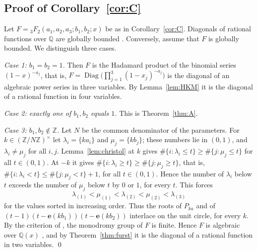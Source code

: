 \documentclass[11pt]{amsart}
\theoremstyle{definition}
\theoremstyle{remark}
\numberwithin{equation}{section}
\newcommand{\Q}{\mathbb{Q}}
\newcommand{\Z}{\mathbb{Z}}
\newcommand{\e}{\mathbf{e}}
\DeclareMathOperator{\Diag}{Diag}
\begin{document}
\subsection{Proof of Corollary~\ref{cor:C}}\label{subsec:proofC}
Let $F={}_3F_2(a_1,a_2,a_3;b_1,b_2;x)$ be as in Corollary~\ref{cor:C}. Diagonals of rational functions over $\Q$ are globally bounded \citep{Christol1990}. Conversely, assume that $F$ is globally bounded. We distinguish three cases.

\emph{Case 1: $b_1=b_2=1$.} Then $F$ is the Hadamard product of the binomial series $(1-x)^{-a_j}$, that is, $F=\Diag\big(\prod_{j=1}^3(1-x_j)^{-a_j}\big)$ is the diagonal of an algebraic power series in three variables. By Lemma~\ref{lem:HKM} it is the diagonal of a rational function in four variables.

\emph{Case 2: exactly one of $b_1,b_2$ equals $1$.} This is Theorem~\ref{thm:A}.

\emph{Case 3: $b_1,b_2\notin\Z$.} Let $N$ be the common denominator of the parameters. For $k\in(\Z/N\Z)^\times$ let $\lambda_i=\{ka_i\}$ and $\mu_j=\{kb_j\}$; these numbers lie in $(0,1)$, and $\lambda_i\ne\mu_j$ for all $i,j$. Lemma~\ref{lem:christol} at $k$ gives $\#\{i:\lambda_i\le t\}\ge\#\{j:\mu_j\le t\}$ for all $t\in(0,1)$. At $-k$ it gives $\#\{i:\lambda_i\ge t\}\ge\#\{j:\mu_j\ge t\}$, that is, $\#\{i:\lambda_i<t\}\le\#\{j:\mu_j<t\}+1$, for all $t\in(0,1)$. Hence the number of $\lambda_i$ below $t$ exceeds the number of $\mu_j$ below $t$ by $0$ or $1$, for every $t$. This forces
\[
\lambda_{(1)}<\mu_{(1)}<\lambda_{(2)}<\mu_{(2)}<\lambda_{(3)}
\]
for the values sorted in increasing order. Thus the roots of $P_{ka}$ and of $(t-1)(t-\e(kb_1))(t-\e(kb_2))$ interlace on the unit circle, for every $k$. By the criterion of \citet[Theorem~4.8]{BeukersHeckman1989}, the monodromy group of $F$ is finite. Hence $F$ is algebraic over $\Q(x)$ \citep[compare][Theorem~33]{Christol2015}, and by Theorem~\ref{thm:furst} it is the diagonal of a rational function in two variables. \qed
\end{document}
